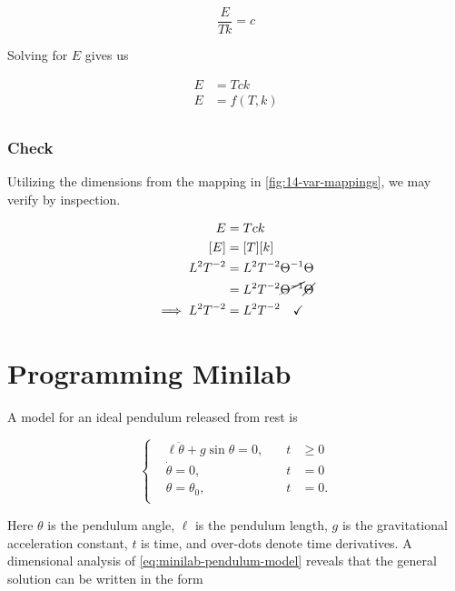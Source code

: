 \documentclass[12pt]{article}
\begin{document}
  \begin{equation}
    \frac{E}{Tk} = c
  \end{equation}

  Solving for $E$ gives us

  \begin{equation}
    \boxed{
      \begin{aligned}
        E &= Tck \\
        E &= f(T,k) \\
      \end{aligned}
    }
  \end{equation}

  \subsubsection*{Check}
  Utilizing the dimensions from the mapping in \cref{fig:14-var-mappings}, we
  may verify by inspection.

  \begin{equation}
    \begin{aligned}
      E &= Tck \\
      [E] &= [T][k] \\
      L^2T^{-2} &= L^2T^{-2}\Theta^{-1} \Theta \\
       &= L^2T^{-2} \cancel{\Theta^{-1}} \cancel{\Theta} \\
      \implies L^2T^{-2} &= L^2T^{-2} \quad\checkmark \\
    \end{aligned}
  \end{equation}


\section{Programming Minilab}
A model for an ideal pendulum released from rest is

\begin{equation}
  \label{eq:minilab-pendulum-model}
   \left\{
  \begin{aligned}
    &\ell\ddot{\theta}+g\sin\theta = 0, \quad &t &\ge0 \\
    &\dot{\theta} = 0, \quad &t &= 0 \\
    &\theta = \theta_0, \quad &t &= 0. \\
  \end{aligned}\right.
\end{equation}

Here $\theta$ is the pendulum angle, $\ell$ is the pendulum length, $g$ is the
gravitational acceleration constant, $t$ is time, and over-dots denote time
derivatives. A dimensional analysis of \cref{eq:minilab-pendulum-model} reveals
that the general solution can be written in the form
\end{document}
